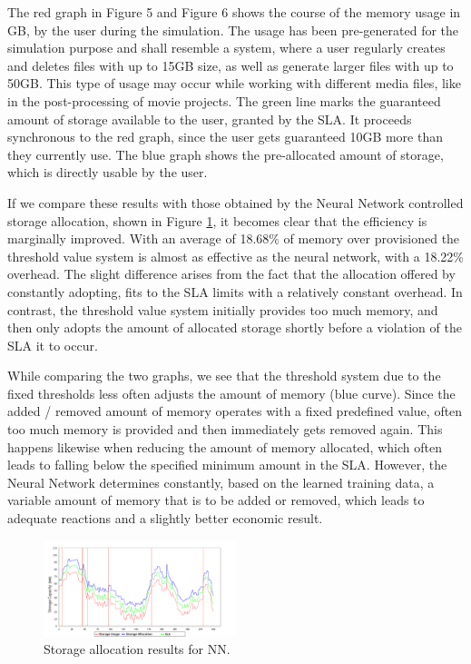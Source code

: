 The red graph in Figure 5 and Figure 6 shows the course of the memory usage in GB, by the user during the simulation. The usage has been pre-generated for the simulation purpose and shall resemble a system, where a user regularly creates and deletes files with up to 15GB size, as well as generate larger files with up to 50GB. This type of usage may occur while working with different media files, like in the post-processing of movie projects. The green line marks the guaranteed amount of storage available to the user, granted by the SLA. It proceeds synchronous to the red graph, since the user gets guaranteed 10GB more than they currently use. The blue graph shows the pre-allocated amount of storage, which is directly usable by the user.

If we compare these results with those obtained by the Neural Network controlled storage allocation, shown in Figure \ref{fig:ResultsNN}, it becomes clear that the efficiency is marginally improved. With an average of 18.68\% of memory over provisioned the threshold value system is almost as effective as the neural network, with a 18.22\% overhead. The slight difference arises from the fact that the allocation offered by constantly adopting, fits to the SLA limits with a relatively constant overhead. In contrast, the threshold value system initially provides too much memory, and then only adopts the amount of allocated storage shortly before a violation of the SLA it to occur.

While comparing the two graphs, we see that the threshold system due to the fixed thresholds less often adjusts the amount of memory (blue curve). Since the added / removed amount of memory operates with a fixed predefined value​​, often too much memory is provided and then immediately gets removed again. This happens likewise when reducing the amount of memory allocated, which often leads to falling below the specified minimum amount in the SLA. However, the Neural Network determines constantly, based on the learned training data, a variable amount of memory that is to be added or removed, which leads to adequate reactions and a slightly better economic result.

\begin{figure}[ht]
	\begin{center}
		\includegraphics[width=0.5\textwidth]{fig/storage-nn3.png}
	\end{center}
	\caption{Storage allocation results for NN.}
	\label{fig:ResultsNN}
\end{figure}

